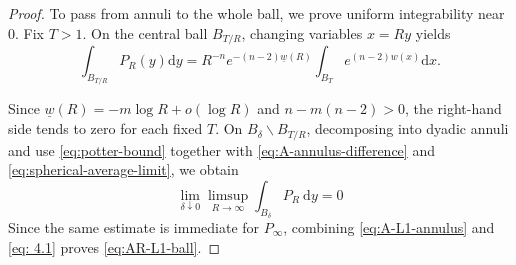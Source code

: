 \documentclass[12pt]{amsart}
\theoremstyle{plain}
\theoremstyle{definition}
\theoremstyle{remark}     %
\numberwithin{equation}{section}
\newcommand{\dd}{\mathop{}\!\mathrm{d}}%
\begin{document}
\begin{proof}
To pass from annuli to the whole ball, we prove uniform integrability near 0. Fix $T>1$. On the central ball $B_{T / R}$, changing variables $x=R y$ yields
\[
\int_{B_{T / R}} P_R(y) \mathrm{d} y=R^{-n} e^{-(n-2) \underline{w}(R)} \int_{B_T} e^{(n-2) w(x)} \mathrm{d} x.
\]

Since $\underline{w}(R)=-m \log R+o(\log R)$ and $n-m(n-2)>0$, the right-hand side tends to zero for each fixed $T$. On $B_\delta \backslash B_{T / R}$, decomposing into dyadic annuli and use \cref{eq:potter-bound} together with \cref{eq:A-annulus-difference} and \cref{eq:spherical-average-limit}, we obtain
\begin{equation} \label{eq: 4.1}
\lim _{\delta \downarrow 0} \limsup _{R \rightarrow \infty} \int_{B_\delta} P_R \mathrm{~d} y=0 
\end{equation}
Since the same estimate is immediate for $P_{\infty}$, combining \cref{eq:A-L1-annulus} and \cref{eq: 4.1} proves \cref{eq:AR-L1-ball}.




\end{proof}
\end{document}
